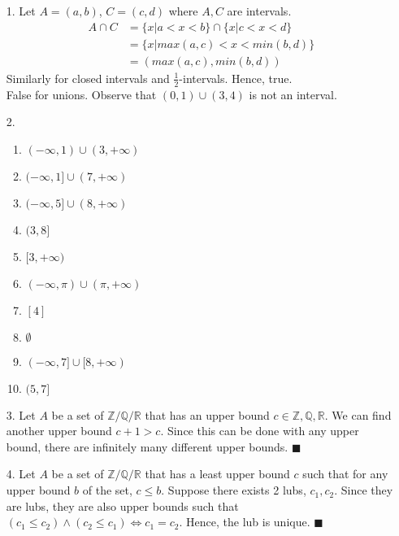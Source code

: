 \documentclass[11pt]{exam}
\author{@dante}
\begin{document}

\begin{enumerate}[leftmargin=0pt]

\item[1.] Let $A = (a, b)$, $C = (c, d)$ where $A, C$ are intervals.
\begin{align*}
    A \cap C &= \{x | a < x < b\} \cap \{x | c < x < d\} \\
    &= \{x | max(a,c) < x < min(b,d)\} \\
    &= (max(a,c), min(b,d))
\end{align*}
Similarly for closed intervals and $\frac{1}{2}$-intervals. Hence, true. \\
False for unions. Observe that $(0, 1) \cup (3, 4)$ is not an interval.

\item[2.] 
\begin{enumerate}[label=(\alph*)]
    \item $(-\infty, 1) \cup (3, +\infty)$
    \item $(-\infty, 1] \cup (7, +\infty)$
    \item $(-\infty, 5] \cup (8, +\infty)$
    \item  $(3, 8]$
    \item $[3, +\infty)$
    \item $(-\infty, \pi) \cup (\pi, +\infty)$
    \item $[4]$
    \item $\emptyset$
    \item $(-\infty, 7] \cup [8, +\infty)$
    \item $(5, 7]$
\end{enumerate}

\item[3.] Let $A$ be a set of $\mathbb{Z}/\mathbb{Q}/\mathbb{R}$ that has an upper bound $c \in \mathbb{Z}, \mathbb{Q}, \mathbb{R}$. We can find another upper bound $c + 1 > c$. Since this can be done with any upper bound, there are infinitely many different upper bounds. $\blacksquare$

\item[4.] Let $A$ be a set of $\mathbb{Z}/\mathbb{Q}/\mathbb{R}$ that has a least upper bound $c$ such that for any upper bound $b$ of the set, $c \leq b$. Suppose there exists 2 lubs, $c_1, c_2$. Since they are lubs, they are also upper bounds such that $(c_1 \leq c_2) \land (c_2 \leq c_1) \Leftrightarrow c_1 = c_2$. Hence, the lub is unique. $\blacksquare$


\end{enumerate}
\end{document}

